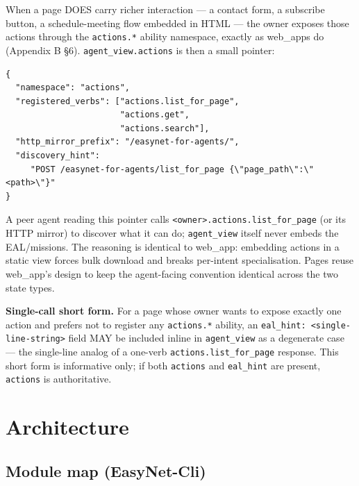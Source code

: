 \documentclass[11pt,a4paper]{article}
\theoremstyle{definition}
\begin{document}
When a page DOES carry richer interaction --- a contact form, a
subscribe button, a schedule-meeting flow embedded in HTML ---
the owner exposes those actions through the \texttt{actions.*}
ability namespace, exactly as web\_apps do (Appendix B \S6).
\texttt{agent\_view.actions} is then a small pointer:

\begin{lstlisting}
{
  "namespace": "actions",
  "registered_verbs": ["actions.list_for_page",
                       "actions.get",
                       "actions.search"],
  "http_mirror_prefix": "/easynet-for-agents/",
  "discovery_hint":
     "POST /easynet-for-agents/list_for_page {\"page_path\":\"<path>\"}"
}
\end{lstlisting}

A peer agent reading this pointer calls
\texttt{<owner>.actions.list\_for\_page} (or its HTTP mirror) to
discover what it can do; \texttt{agent\_view} itself never
embeds the EAL/missions. The reasoning is identical to web\_app:
embedding actions in a static view forces bulk download and
breaks per-intent specialisation. Pages reuse web\_app's design
to keep the agent-facing convention identical across the two
state types.

\textbf{Single-call short form.} For a page whose owner wants to
expose exactly one action and prefers not to register any
\texttt{actions.*} ability, an
\texttt{eal\_hint: <single-line-string>} field MAY be included
inline in \texttt{agent\_view} as a degenerate case --- the
single-line analog of a one-verb \texttt{actions.list\_for\_page}
response. This short form is informative only; if both
\texttt{actions} and \texttt{eal\_hint} are present, \texttt{actions}
is authoritative.

\section{Architecture}
\label{sec:architecture}

\subsection{Module map (EasyNet-Cli)}
\label{sec:module-map}
\end{document}
